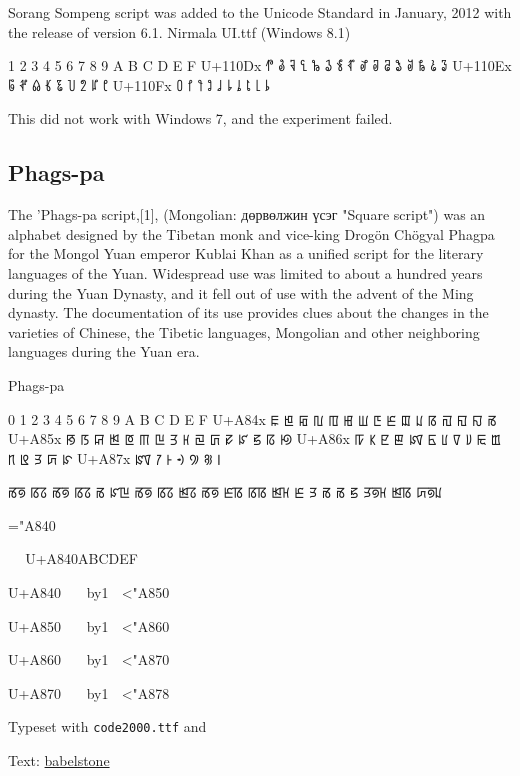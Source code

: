 Sorang Sompeng script was added to the Unicode Standard in January, 2012 with the release of version 6.1. Nirmala UI.ttf (Windows 8.1)


\bgroup
{}	1	2	3	4	5	6	7	8	9	A	B	C	D	E	F
U+110Dx	𑃐	𑃑	𑃒	𑃓	𑃔	𑃕	𑃖	𑃗	𑃘	𑃙	𑃚	𑃛	𑃜	𑃝	𑃞	𑃟
U+110Ex	𑃠	𑃡	𑃢	𑃣	𑃤	𑃥	𑃦	𑃧	𑃨							
U+110Fx	𑃰	𑃱	𑃲	𑃳	𑃴	𑃵	𑃶	𑃷	𑃸	𑃹	
\egroup

This did not work with Windows 7, and the experiment failed. 

\subsection{Phags-pa}

The 'Phags-pa script,[1], (Mongolian: дөрвөлжин үсэг "Square script") was an alphabet designed by the Tibetan monk and vice-king Drogön Chögyal Phagpa for the Mongol Yuan emperor Kublai Khan as a unified script for the literary languages of the Yuan. Widespread use was limited to about a hundred years during the Yuan Dynasty, and it fell out of use with the advent of the Ming dynasty. The documentation of its use provides clues about the changes in the varieties of Chinese, the Tibetic languages, Mongolian and other neighboring languages during the Yuan era.

\newfontfamily{}

\begin{scriptexample}[]{Phags-pa}
\bgroup
\obeylines
\phagspa

 	0	1	2	3	4	5	6	7	8	9	A	B	C	D	E	F
U+A84x	ꡀ	ꡁ	ꡂ	ꡃ	ꡄ	ꡅ	ꡆ	ꡇ	ꡈ	ꡉ	ꡊ	ꡋ	ꡌ	ꡍ	ꡎ	ꡏ
U+A85x	ꡐ	ꡑ	ꡒ	ꡓ	ꡔ	ꡕ	ꡖ	ꡗ	ꡘ	ꡙ	ꡚ	ꡛ	ꡜ	ꡝ	ꡞ	ꡟ
U+A86x	ꡠ	ꡡ	ꡢ	ꡣ	ꡤ	ꡥ	ꡦ	ꡧ	ꡨ	ꡩ	ꡪ	ꡫ	ꡬ	ꡭ	ꡮ	ꡯ
U+A87x	ꡰ	ꡱ	ꡲ	ꡳ	꡴	꡵	꡶	


ꡏꡟ ꡋꡞ ꡏꡟ ꡋꡞ ꡏ ꡜꡖ ꡏꡟ ꡋꡞ ꡓꡞ ꡏꡟ
ꡈꡋ ꡋꡋ ꡓꡘ ꡈ ꡭ ꡏ ꡏ ꡝ ꡭꡟꡘ ꡓꡋ ꡮꡟꡊ
\egroup
\bgroup
\raggedright

\setcounter{glyphcount}{"A840}

\topline
\phagspa
\newcount\n
\n="A840

\def\htable{^^A
  \def\fm##1{\makebox[2em]##1}^^A
  U+A840\fm 0\fm1\fm2\fm3\fm4\fm5\fm 6\fm 7\fm 8\fm	9\fm A\fm B\fm C\fm D\fm E\fm F}

\htable\par
U+A840^^A 
\loop^^A
  \makebox[2em]{\char\n }^^A   
   \advance\n by1 ^^A
   \ifnum\n<"A850^^A
\repeat
\par U+A850^^A
\loop^^A
  \makebox[2em]{\char\n }^^A   
   \advance\n by1 ^^A
  \ifnum\n<"A860^^A
\repeat
\par U+A860^^A
\loop^^A
  \makebox[2em]{\char\n }^^A   
   \advance\n by1 ^^A
  \ifnum\n<"A870^^A
\repeat
\par U+A870^^A
\loop^^A
  \makebox[2em]{\char\n }^^A   
   \advance\n by1 ^^A
  \ifnum\n<"A878^^A
\repeat

\bottomline

\arial
\hfill Typeset with \texttt{code2000.ttf} and \cmd{\phagspa}

Text: \href{http://babelstone.blogspot.com/2006/12/phags-pa-fonts-1-babelstone-phags-pa.html}{babelstone}
\egroup
\end{scriptexample}

